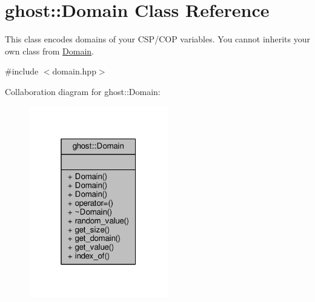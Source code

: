 \hypertarget{classghost_1_1Domain}{}\section{ghost\+:\+:Domain Class Reference}
\label{classghost_1_1Domain}


This class encodes domains of your C\+S\+P/\+C\+OP variables. You cannot inherits your own class from \hyperlink{classghost_1_1Domain}{Domain}.  




{\ttfamily \#include $<$domain.\+hpp$>$}



Collaboration diagram for ghost\+:\+:Domain\+:\nopagebreak
\begin{figure}[H]
\begin{center}
\leavevmode
\includegraphics[width=172pt]{classghost_1_1Domain__coll__graph}
\end{center}
\end{figure}
